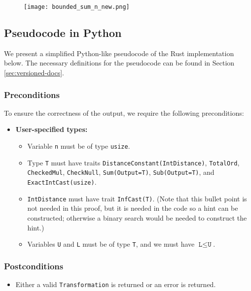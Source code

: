\documentclass[11pt,a4paper]{article}
\theoremstyle{definition}
\begin{document}

\begin{figure}[ht]
    \texttt{[image: bounded\_sum\_n\_new.png]}
    \centering
    \label{fig:code}
\end{figure}

\subsection{Pseudocode in Python}
\label{sec:pseudocode}
We present a simplified Python-like pseudocode of the Rust implementation below. The necessary definitions for the pseudocode can be found in Section \ref{sec:versioned-docs}.

\subsubsection*{Preconditions}
To ensure the correctness of the output, we require the following preconditions:

\begin{itemize}
    \item \textbf{User-specified types:}
    \begin{itemize}
        \item Variable \texttt{n} must be of type \texttt{usize}.
        \item Type \texttt{T} must have traits \texttt{DistanceConstant(IntDistance)}, \texttt{TotalOrd}, \texttt{CheckedMul}, \texttt{CheckNull}, \texttt{Sum(Output=T)}, \texttt{Sub(Output=T)},  and \texttt{ExactIntCast(usize)}.
        \item \texttt{IntDistance} must have trait \texttt{InfCast(T)}. (Note that this bullet point is not needed in this proof, but it is needed in the code so a hint can be constructed; otherwise a binary search would be needed to construct the hint.)
        \item Variables \texttt{U} and \texttt{L} must be of type \texttt{T}, and we must have $\texttt{L} \leq \texttt{U}$.

\end{itemize}
\end{itemize}

\subsubsection*{Postconditions}
\begin{itemize}
    \item Either a valid \texttt{Transformation} is returned or an error is returned.
\end{itemize}
\end{document}
